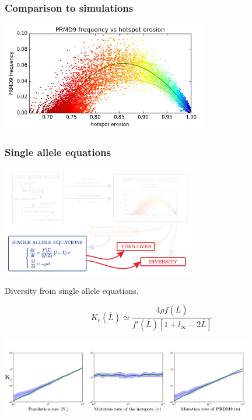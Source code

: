 \documentclass[10pt]{beamer}
\begin{document}
\begin{frame}
	\frametitle{Comparison to simulations}
	\begin{center}
       \includegraphics[width=9cm]{Images/results.png}
	\end{center}
\end{frame}

\begin{frame}
\frametitle{Single allele equations}
	\begin{center}
       \includegraphics[width=8.5cm]{Images/overline-5.png}
	\end{center}
\end{frame}

\begin{frame}
	\begin{center}
		\Large
    Diversity from single allele equations.
	\end{center}
\[
  K_e(\bar{L}) \simeq 
  \dfrac{4 \rho f(\overline{L})}{f'(\overline{L})\left[ 1 + l_{\infty} - 2 \overline{L}  \right]}
\]
	\begin{center}
       \includegraphics[width=11cm]{Images/approximated-diversity.png}
	\end{center}
\end{frame}
\end{document}
